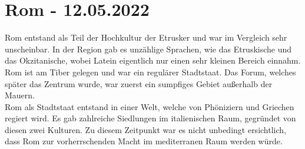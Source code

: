 \documentclass{article}
\begin{document}
	\section{Rom - 12.05.2022}
	Rom entstand als Teil der Hochkultur der Etrusker und war im Vergleich sehr unscheinbar. In der Region gab es unzählige 
	Sprachen, wie das Etruskische und das Okzitanische, wobei Latein eigentlich nur einen sehr kleinen Bereich einnahm. \\
	Rom ist am Tiber gelegen und war ein regulärer Stadtstaat. Das Forum, welches später das Zentrum wurde, war zuerst ein sumpfiges Gebiet außerhalb der Mauern.\\
	Rom als Stadtstaat entstand in einer Welt, welche von Phöniziern und Griechen regiert wird. Es gab zahlreiche Siedlungen im italienischen Raum, gegründet von diesen zwei Kulturen. Zu diesem Zeitpunkt war es nicht unbedingt ersichtlich, dass Rom zur vorherrschenden Macht im mediterranen Raum werden würde.
\end{document}
